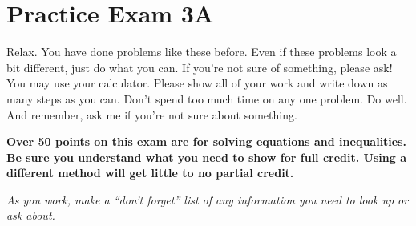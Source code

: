 
\section*{Practice Exam 3A}  

Relax.  You have done problems like these before.  Even if these problems look a bit different, just do what you can.  If you're not sure of something, please ask! You may use your calculator.  Please show all of your work and write down as many steps as you can.  Don't spend too much time on any one problem.  Do well.  And remember, ask me if you're not sure about something. \bigskip

\noindent \textbf{Over 50 points on this exam are for solving equations and inequalities. Be sure you understand what you need to show for full credit.  Using a different method will get little to no partial credit.} \bigskip

\noindent \emph{As you work, make a ``don't forget'' list of any information you need to look up or ask about.} 

\noindent \hrulefill
\bigskip


